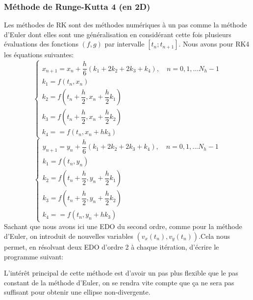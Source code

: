 \documentclass[11pt]{article} %
\begin{document}
\subsubsection{Méthode de Runge-Kutta 4 (en 2D)}
Les méthodes de RK sont des méthodes numériques à un pas comme la méthode d’Euler dont elles sont une généralisation en considérant cette fois plusieurs évaluations des fonctions $(f,g)$ par intervalle $[t_n;t_{n+1}]$. Nous avons pour RK4 les équations suivantes:
\begin{equation}
\begin{cases} x_{n+1} = x_n + \dfrac{h}{6}(k_1+2k_2+2k_3+k_4), \quad n=0,1,... N_h-1 \\
k_1=f(t_n,x_n)\\ k_2=f(t_n+\dfrac{h}{2}, x_n+\dfrac{h}{2}k_1)\\
k_3=f(t_n+\dfrac{h}{2}, x_n+\dfrac{h}{2}k_2)\\ k_4==f(t_n,x_n+hk_3) \end{cases}
\end{equation}
\begin{equation}
\begin{cases} y_{n+1} = y_n + \dfrac{h}{6}(k_1+2k_2+2k_3+k_4), \quad n=0,1,... N_h-1 \\
k_1=f(t_n,y_n)\\ k_2=f(t_n+\dfrac{h}{2}, y_n+\dfrac{h}{2}k_1)\\
k_3=f(t_n+\dfrac{h}{2}, y_n+\dfrac{h}{2}k_2)\\ k_4==f(t_n,y_n+hk_3) \end{cases}
\end{equation}
Sachant que nous avons ici une EDO du second ordre,  comme pour la méthode d'Euler, on introduit de nouvelles variables $(v_x(t_n),v_y(t_n))$.Cela nous permet, en résolvant deux EDO d'ordre 2 à chaque itération, d'écrire le programme suivant:

L'intérêt principal de cette méthode est d'avoir un pas plus flexible que le pas constant de la méthode d'Euler, on se rendra vite compte que ça ne sera pas suffisant pour obtenir une ellipse non-divergente.\\\\
\end{document}
